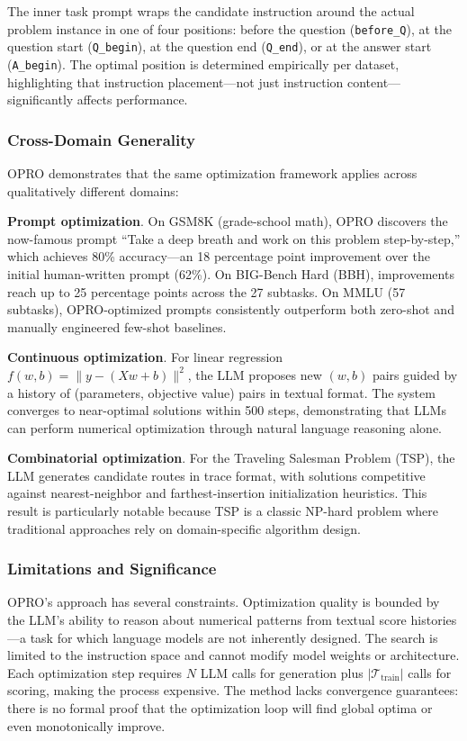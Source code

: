 The inner task prompt wraps the candidate instruction around the actual problem instance in one of four positions: before the question (\texttt{before\_Q}), at the question start (\texttt{Q\_begin}), at the question end (\texttt{Q\_end}), or at the answer start (\texttt{A\_begin}). The optimal position is determined empirically per dataset, highlighting that instruction placement---not just instruction content---significantly affects performance.

\subsubsection{Cross-Domain Generality}

OPRO demonstrates that the same optimization framework applies across qualitatively different domains:

\textbf{Prompt optimization}. On GSM8K (grade-school math), OPRO discovers the now-famous prompt ``Take a deep breath and work on this problem step-by-step,'' which achieves 80\% accuracy---an 18 percentage point improvement over the initial human-written prompt (62\%). On BIG-Bench Hard (BBH), improvements reach up to 25 percentage points across the 27 subtasks. On MMLU (57 subtasks), OPRO-optimized prompts consistently outperform both zero-shot and manually engineered few-shot baselines.

\textbf{Continuous optimization}. For linear regression $f(w,b) = \|y - (Xw + b)\|^2$, the LLM proposes new $(w,b)$ pairs guided by a history of (parameters, objective value) pairs in textual format. The system converges to near-optimal solutions within 500 steps, demonstrating that LLMs can perform numerical optimization through natural language reasoning alone.

\textbf{Combinatorial optimization}. For the Traveling Salesman Problem (TSP), the LLM generates candidate routes in trace format, with solutions competitive against nearest-neighbor and farthest-insertion initialization heuristics. This result is particularly notable because TSP is a classic NP-hard problem where traditional approaches rely on domain-specific algorithm design.

\subsubsection{Limitations and Significance}

OPRO's approach has several constraints. Optimization quality is bounded by the LLM's ability to reason about numerical patterns from textual score histories---a task for which language models are not inherently designed. The search is limited to the instruction space and cannot modify model weights or architecture. Each optimization step requires $N$ LLM calls for generation plus $|\mathcal{T}_{\text{train}}|$ calls for scoring, making the process expensive. The method lacks convergence guarantees: there is no formal proof that the optimization loop will find global optima or even monotonically improve.


